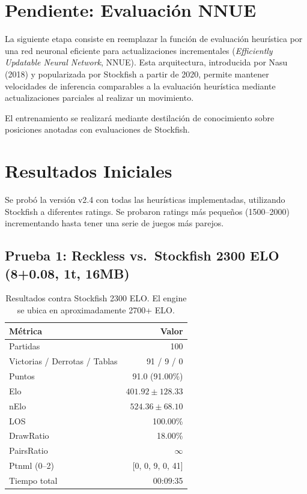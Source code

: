 \documentclass[12pt]{article}
\begin{document}
\section{Pendiente: Evaluación NNUE}

La siguiente etapa consiste en reemplazar la función de evaluación heurística por una red neuronal eficiente para actualizaciones incrementales (\textit{Efficiently Updatable Neural Network}, NNUE). Esta arquitectura, introducida por Nasu (2018) y popularizada por Stockfish a partir de 2020, permite mantener velocidades de inferencia comparables a la evaluación heurística mediante actualizaciones parciales al realizar un movimiento.

El entrenamiento se realizará mediante destilación de conocimiento sobre posiciones anotadas con evaluaciones de Stockfish.

\section{Resultados Iniciales}

Se probó la versión v2.4 con todas las heurísticas implementadas, utilizando Stockfish a diferentes ratings. Se probaron ratings más pequeños (1500--2000) incrementando hasta tener una serie de juegos más parejos.

\subsection*{Prueba 1: Reckless vs.\ Stockfish 2300 ELO (8+0.08, 1t, 16MB)}

\begin{table}[h]
\centering
\begin{tabular}{@{}lr@{}}
\toprule
\textbf{Métrica} & \textbf{Valor} \\
\midrule
Partidas & 100 \\
Victorias / Derrotas / Tablas & 91 / 9 / 0 \\
Puntos & 91.0 (91.00\%) \\
Elo & $401.92 \pm 128.33$ \\
nElo & $524.36 \pm 68.10$ \\
LOS & 100.00\% \\
DrawRatio & 18.00\% \\
PairsRatio & $\infty$ \\
Ptnml (0--2) & [0, 0, 9, 0, 41] \\
Tiempo total & 00:09:35 \\
\bottomrule
\end{tabular}
\caption{Resultados contra Stockfish 2300 ELO. El engine se ubica en aproximadamente 2700+ ELO.}
\end{table}
\end{document}
